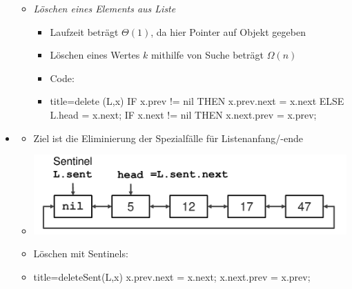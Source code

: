 \documentclass[
    12pt,
    a4paper,
    ngerman,
    color=3b,%
    marginpar=false,
    colorback=false,
    leqno,
]{tudaexercise}
\begin{document}
\begin{itemize}
\begin{itemize}
              \item \textit{Löschen eines Elements aus Liste}
                    \begin{itemize}
                        \item Laufzeit beträgt $\Theta(1)$, da hier Pointer auf Objekt gegeben
                        \item[] Löschen eines Wertes $k$ mithilfe von Suche beträgt $\Omega(n)$
                        \item Code:
                        \item[]
                              \begin{codeBlock}[autogobble]{title={delete (L,x)}}
                                  IF x.prev != nil THEN
                                    x.prev.next = x.next
                                  ELSE
                                    L.head = x.next;
                                  IF x.next != nil THEN
                                    x.next.prev = x.prev;
                              \end{codeBlock}
                    \end{itemize}
          \end{itemize}

    \item {}
          \begin{itemize}
              \item Ziel ist die Eliminierung der Spezialfälle für Listenanfang/-ende
              \item[] \includegraphics[width=12cm]{pictures/linkedListSentinel.pdf}
              \item Löschen mit Sentinels:
              \item[]
                    \begin{codeBlock}[autogobble]{title={deleteSent(L,x)}}
                        x.prev.next = x.next;
                        x.next.prev = x.prev;
                    \end{codeBlock}
          \end{itemize}
\end{itemize}
\clearpage
\end{document}
